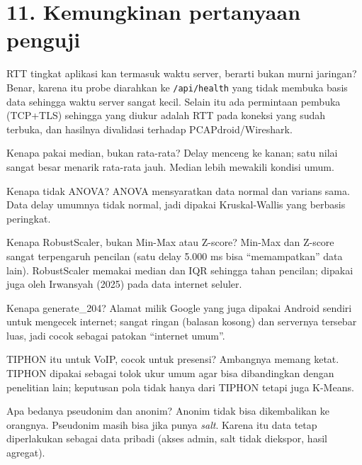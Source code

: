 \section*{11. Kemungkinan pertanyaan penguji}
\setcounter{tanya}{0}
\begin{tanya}{RTT tingkat aplikasi kan termasuk waktu server, berarti bukan murni jaringan?}
Benar, karena itu probe diarahkan ke \texttt{/api/health} yang tidak membuka basis data sehingga waktu server sangat kecil. Selain itu ada permintaan pembuka (TCP+TLS) sehingga yang diukur adalah RTT pada koneksi yang sudah terbuka, dan hasilnya divalidasi terhadap PCAPdroid/Wireshark.
\end{tanya}
\begin{tanya}{Kenapa pakai median, bukan rata-rata?}
Delay menceng ke kanan; satu nilai sangat besar menarik rata-rata jauh. Median lebih mewakili kondisi umum.
\end{tanya}
\begin{tanya}{Kenapa tidak ANOVA?}
ANOVA mensyaratkan data normal dan varians sama. Data delay umumnya tidak normal, jadi dipakai Kruskal-Wallis yang berbasis peringkat.
\end{tanya}
\begin{tanya}{Kenapa RobustScaler, bukan Min-Max atau Z-score?}
Min-Max dan Z-score sangat terpengaruh pencilan (satu delay 5.000 ms bisa ``memampatkan'' data lain). RobustScaler memakai median dan IQR sehingga tahan pencilan; dipakai juga oleh Irwansyah (2025) pada data internet seluler.
\end{tanya}
\begin{tanya}{Kenapa generate\_204?}
Alamat milik Google yang juga dipakai Android sendiri untuk mengecek internet; sangat ringan (balasan kosong) dan servernya tersebar luas, jadi cocok sebagai patokan ``internet umum''.
\end{tanya}
\begin{tanya}{TIPHON itu untuk VoIP, cocok untuk presensi?}
Ambangnya memang ketat. TIPHON dipakai sebagai tolok ukur umum agar bisa dibandingkan dengan penelitian lain; keputusan pola tidak hanya dari TIPHON tetapi juga K-Means.
\end{tanya}
\begin{tanya}{Apa bedanya pseudonim dan anonim?}
Anonim tidak bisa dikembalikan ke orangnya. Pseudonim masih bisa jika punya \textit{salt}. Karena itu data tetap diperlakukan sebagai data pribadi (akses admin, salt tidak diekspor, hasil agregat).
\end{tanya}

